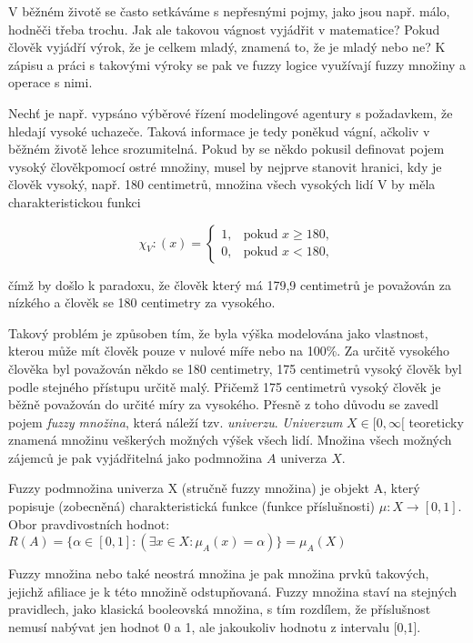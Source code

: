 V běžném životě se často setkáváme s nepřesnými pojmy, jako jsou např. \clqq málo\crqq, \clqq hodně\crqq \space či třeba \clqq trochu\crqq \space. Jak ale takovou vágnost vyjádřit v matematice? Pokud člověk vyjádří výrok, že je \clqq celkem mladý\crqq, znamená to, že je mladý nebo ne? K zápisu a práci s takovými výroky se pak ve fuzzy logice využívají fuzzy množiny a operace s nimi.

Nech\v t je např. vypsáno výběrové řízení modelingové agentury s požadavkem, že hledají vysoké uchazeče. Taková informace je tedy poněkud vágní, ačkoliv v běžném životě lehce srozumitelná. Pokud by se někdo pokusil definovat pojem \clqq vysoký člověk\crqq \space pomocí ostré množiny, musel by nejprve stanovit hranici, kdy je člověk vysoký, např. 180 centimetr\r u, množina všech vysokých lidí V by měla charakteristickou funkci

    $$\chi_V:(x)=\begin{cases} 1, & \mbox{pokud }  x \geq 180,\\    0, & \mbox{pokud } x < 180,  \end{cases}$$

    čímž by došlo k paradoxu, že člověk který má 179,9 centimetr\r u je považován za nízkého a člověk se 180 centimetry za vysokého.

    Takový problém je zp\r usoben tím, že byla výška modelována jako vlastnost, kterou m\r uže mít člověk pouze v nulové míře nebo na 100\%. Za určitě vysokého člověka byl považován někdo se 180 centimetry, 175 centimetr\r u vysoký člověk byl podle stejného přístupu určitě malý. Přičemž 175 centimetr\r u vysoký člověk je běžně považován do určité míry za vysokého. Přesně z toho d\r uvodu se zavedl pojem \textit{fuzzy množina}, která náleží tzv. \textit{univerzu}. \textit{Univerzum} $X \in [0,\infty[$ teoreticky znamená množinu veškerých možných výšek všech lidí. Množina všech možných zájemc\r u je pak vyjádřitelná jako podmnožina $A$ univerza $X.$
    \begin{definition}
    \cite{navara}
        Fuzzy podmnožina univerza X (stručně fuzzy množina) je objekt A, který popisuje (zobecněná) charakteristická funkce (funkce příslušnosti) $\mu: X \rightarrow [0,1]$. Obor pravdivostních hodnot: $R(A) = \{\alpha \in [0,1]: (\exists x \in X : \mu_A(x) = \alpha)\} = \mu_A(X)$
    \end{definition}
    Fuzzy množina nebo také neostrá množina je pak množina prvků takových, jejichž afiliace je k této množině odstupňovaná. Fuzzy množina staví na stejných pravidlech, jako klasická booleovská množina, s tím rozdílem, že příslušnost nemusí nabývat jen hodnot 0 a 1, ale jakoukoliv hodnotu z intervalu [0,1]. 
    
